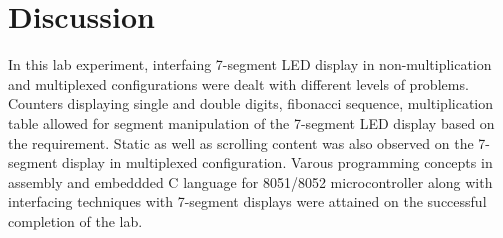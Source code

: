 \documentclass{lab_sheet}
\begin{document}
            \section{Discussion}
            In this lab experiment, interfaing 7-segment LED display in non-multiplication and multiplexed configurations were dealt with different levels of problems. Counters displaying single and double digits, fibonacci sequence, multiplication table allowed for segment manipulation of the 7-segment LED display based on the requirement. Static as well as scrolling content was also observed on the 7-segment display in multiplexed configuration. Varous programming concepts in assembly and embeddded C language for 8051/8052 microcontroller along with interfacing techniques with 7-segment displays were attained on the successful completion of the lab.
            \pagebreak 
\printbibliography[heading=bibintoc,title={Bibliography}, category=cited]
\printbibliography[heading=bibintoc,title={Additional References},notcategory=cited]
\end{document}
